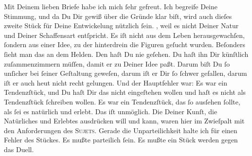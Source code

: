 \pstart
           Mit Deinem lieben Briefe habe ich mich{ }ſehr gefreut. Ich begreife Deine Stimmung, und
               da Du Dir gewiß über die Gründe klar biſt, wird auch dieſes zweite Stück für Deine Entwickelung nützlich{ }ſein.
                  \label{K_L02790-9v}\label{K_L02790-9}, weil es nicht Deiner Natur und Deiner Schaffensart entſpricht. Es iſt nicht
               aus dem Leben herausgewachſen,{ }ſondern aus einer Idee, zu der hinterdrein die Figuren
               geſucht wurden. Beſonders {\pb}ſieht man das an dem Helden. Den haſt Du nie
               geſehen. Du haſt ihn Dir künſtlich zuſammenzimmern müſſen, damit er zu Deiner Idee
               paßt. Darum biſt Du{ }ſo unſicher bei{ }ſeiner Geſtaltung geweſen, darum iſt er Dir{ }ſo{ }ſchwer gefallen, darum iſt er auch heut nicht recht gelungen. Und der Hauptfehler
               war: Es war ein Tendenzſtück, und Du haſt Dir das nicht eingeſtehen wollen und haſt
               es nicht als Tendenzſtück{ }ſchreiben wollen. Es war ein Tendenzſtück, das{ }ſo ausſehen{ }ſollte, als{ }ſei es natürlich {\pb}und erlebt. Das iſt
               unmöglich. Die \label{K_L02790-10v}\label{K_L02790-10}
               Deiner Kunſt, die Natürliches und Erlebtes ausdrücken will und kann, waren hier im
               Zwieſpalt mit den Anforderungen des \textsc{Sujets}. Gerade die
               Unparteilichkeit halte ich für einen Fehler des Stückes. Es mußte parteilich{ }ſein. Es mußte ein Stück werden gegen das Duell.
